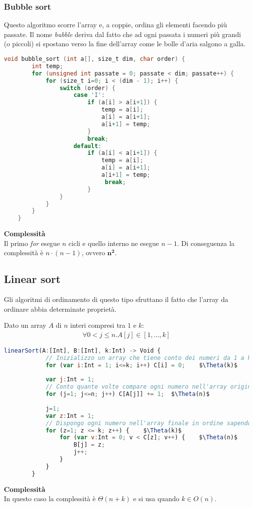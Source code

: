 \subsubsection{Bubble sort}
Questo algoritmo scorre l'array e, a coppie, ordina gli elementi facendo più passate. Il nome \emph{bubble} deriva dal fatto che ad ogni passata i numeri più grandi (o piccoli) si spostano verso la fine dell'array come le bolle d'aria salgono a galla.
\begin{lstlisting}[language=C, caption=Algoritmo bubble sort, mathescape=true]
	void bubble_sort (int a[], size_t dim, char order) {
		int temp;
		for (unsigned int passate = 0; passate < dim; passate++) {
			for (size_t i=0; i < (dim - 1); i++) {
				switch (order) {
					case 'I':
						if (a[i] > a[i+1]) {
							temp = a[i];
							a[i] = a[i+1];
							a[i+1] = temp;
						}
						break;
					default:
						if (a[i] < a[i+1]) {
							temp = a[i];
							a[i] = a[i+1];
							a[i+1] = temp;
							 break;
						}
				}
			}
		}
	}
\end{lstlisting}
\textbf{Complessità}\\
Il primo \emph{for} esegue $n$ cicli e quello interno ne esegue $n-1$. Di conseguenza la complessità è $n\cdot (n-1)$, ovvero $\mathbf{n^2}$.
\subsection{Linear sort}
Gli algoritmi di ordinamento di questo tipo sfruttano il fatto che l'array da ordinare abbia determinate proprietà.
\begin{example}
	Dato un array $A$ di $n$ interi compresi tra $1$ e $k$:
	\begin{align*}
		\forall 0 < j \leq n . A[j] \in [1, \ldots, k]
	\end{align*}
	\begin{lstlisting}[language=Javascript, caption=Algoritmo linear sort, mathescape=true]
		linearSort(A:[Int], B:[Int], k:Int) -> Void {
			// Inizializzo un array che tiene conto dei numeri da 1 a k
			for (var i:Int = 1; i<=k; i++) C[i] = 0;	$\Theta(k)$
			
			var j:Int = 1;
			// Conto quante volte compare ogni numero nell'array originale
			for (j=1; j<=n; j++) C[A[j]] += 1;	$\Theta(n)$
				
			j=1;
			var z:Int = 1;
			// Dispongo ogni numero nell'array finale in ordine sapendo quante volte compare
			for (z=1; z <= k; z++) {	$\Theta(k)$
				for (var v:Int = 0; v < C[z]; v++) {	$\Theta(n)$
					B[j] = z;
					j++;	
				}	
			}	
		}
	\end{lstlisting}
	\textbf{Complessità}\\
	In questo caso la complessità è $\Theta(n + k)$ e si usa quando $k \in O(n)$.
\end{example}
